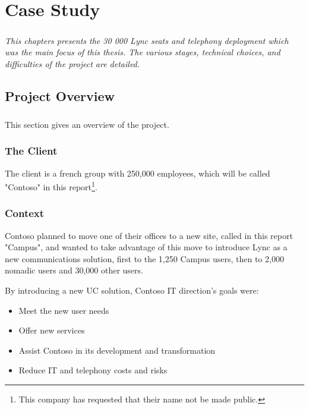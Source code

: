 \chapter{Case Study}\label{chapter_case}

\paragraph{}
\textit{This chapters presents the 30 000 Lync seats and telephony deployment which was the main focus of this thesis. The various stages, technical choices, and difficulties of the project are detailed.}


\section{Project Overview}
\paragraph{}
This section gives an overview of the project.

\subsection{The Client}
	The client is a french group with 250,000 employees, which will be called "Contoso" in this report\footnote{This company has requested that their name not be made public.}.
	
\subsection{Context}
	Contoso planned to move one of their offices to a new site, called in this report "Campus", and wanted to take advantage of this move to introduce Lync as a new communications solution, first to the 1,250 Campus users, then to 2,000 nomadic users and 30,000 other users.

	By introducing a new UC solution, Contoso IT direction's goals were:
	\begin{itemize}
		\item Meet the new user needs
		\item Offer new services
		\item Assist Contoso in its development and transformation
		\item Reduce IT and telephony costs and risks
	\end{itemize}

		
